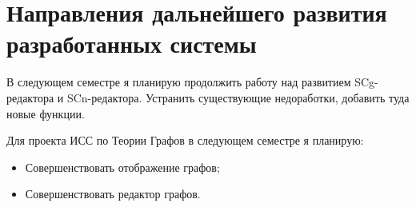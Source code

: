 \newpage
\section{Направления дальнейшего развития разработанных системы}
\label{sec:domain5}

В следующем семестре я планирую продолжить работу над развитием SCg-редактора и SCn-редактора. Устранить существующие недоработки, добавить туда новые функции.

Для проекта ИСС по Теории Графов в следующем семестре я планирую:
\begin{itemize}
\item{Совершенствовать отображение графов;}
\item{Совершенствовать редактор графов.}
\end{itemize}





